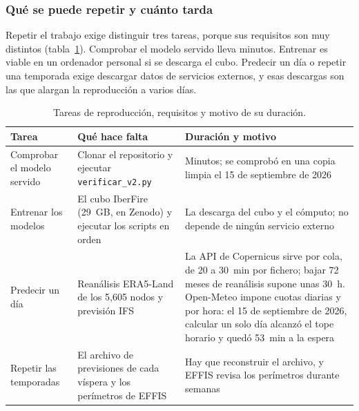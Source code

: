 \documentclass[10pt,a4paper]{article}
\begin{document}
\subsubsection{Qué se puede repetir y cuánto tarda}
\label{an:b5-reproducir}

Repetir el trabajo exige distinguir tres tareas, porque sus requisitos son muy
distintos (tabla~\ref{tab:reproducir}). Comprobar el modelo servido lleva
minutos. Entrenar es viable en un ordenador personal si se descarga el cubo.
Predecir un día o repetir una temporada exige descargar datos de servicios
externos, y esas descargas son las que alargan la reproducción a varios días.

\begin{table}[H]
  \centering
  \caption{Tareas de reproducción, requisitos y motivo de su duración.}
  \label{tab:reproducir}
  \footnotesize
  \begin{tabular}{@{}>{\raggedright}p{2.8cm}>{\raggedright}p{5.9cm}>{\raggedright\arraybackslash}p{7.8cm}@{}}
    \toprule
    Tarea & Qué hace falta & Duración y motivo \\
    \midrule
    Comprobar el modelo servido & Clonar el repositorio y ejecutar \texttt{verificar\_v2.py} & Minutos; se comprobó en una copia limpia el 15 de septiembre de 2026 \\
    Entrenar los modelos & El cubo IberFire (29~GB, en Zenodo) y ejecutar los scripts en orden & La descarga del cubo y el cómputo; no depende de ningún servicio externo \\
    Predecir un día & Reanálisis ERA5-Land de los 5,605 nodos y previsión IFS & La API de Copernicus sirve por cola, de 20 a 30~min por fichero; bajar 72 meses de reanálisis supone unas 30~h. Open-Meteo impone cuotas diarias y por hora: el 15 de septiembre de 2026, calcular un solo día alcanzó el tope horario y quedó 53~min a la espera \\
    Repetir las temporadas & El archivo de previsiones de cada víspera y los perímetros de EFFIS & Hay que reconstruir el archivo, y EFFIS revisa los perímetros durante semanas \\
    \bottomrule
  \end{tabular}
\end{table}
\end{document}
